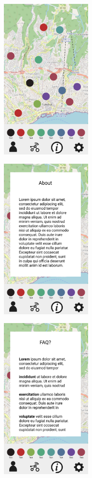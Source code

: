 \begin{figure}
    \centering
    \begin{subfigure}{0.33\textwidth}
        \centering
        \includegraphics[width=130pt]{../assets/images/medium_homepage.png}
        \caption{}
        \label{fig:mediumhome}
    \end{subfigure}%
    \begin{subfigure}{0.33\textwidth}
        \centering
        \includegraphics[width=130pt]{../assets/images/medium_about.png}
        \caption{}
        \label{fig:mediumabout}
    \end{subfigure}%
    \begin{subfigure}{0.33\textwidth}
        \centering
        \includegraphics[width=130pt]{../assets/images/medium_more_info.png}

\end{subfigure}
\end{figure}
